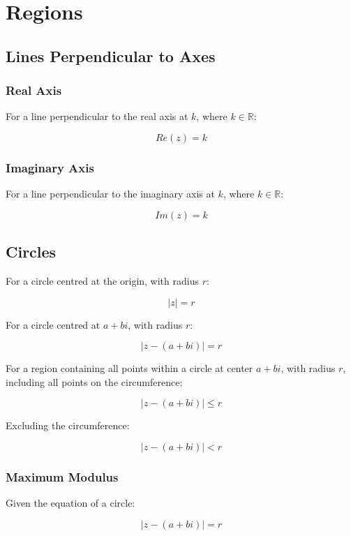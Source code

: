 \documentclass[a4paper,11pt]{article}
\begin{document}
\section{Regions}

\subsection{Lines Perpendicular to Axes}

\subsubsection{Real Axis}

For a line perpendicular to the real axis at $k$, where $k \in \mathbb{R}$:

$$
Re(z) = k
$$


\subsubsection{Imaginary Axis}

For a line perpendicular to the imaginary axis at $k$, where $k \in \mathbb{R}$:

$$
Im(z) = k
$$


\subsection{Circles}

For a circle centred at the origin, with radius $r$:

$$
\lvert z \rvert = r
$$

For a circle centred at $a + bi$, with radius $r$:

$$
\lvert z - (a + bi) \rvert = r
$$

For a region containing all points within a circle at center $a + bi$, with
radius $r$, including all points on the circumference:

$$
\lvert z - (a + bi) \rvert \leq r
$$

Excluding the circumference:

$$
\lvert z - (a + bi) \rvert < r
$$


\subsubsection{Maximum Modulus}

Given the equation of a circle:

$$
\lvert z - (a + bi) \rvert = r
$$
\end{document}

